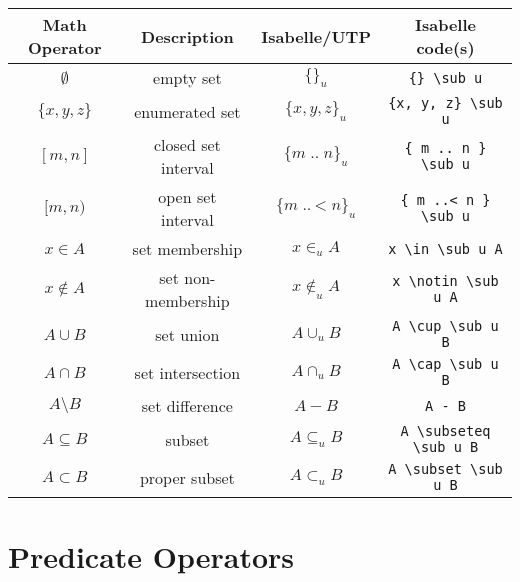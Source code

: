 \documentclass[11pt]{article}
\begin{document}
\begin{center}
\begin{tabular}{|c|c|c|c|} \hline
  \textbf{Math Operator}         & \textbf{Description}        & \textbf{Isabelle/UTP}          & \textbf{Isabelle code(s)} \\ \hline
  $\emptyset$                    & empty set                   & $\{\}_u$                       & \verb|{} \sub u| \\
  $\{ x, y, z \}$                & enumerated set              & $\{ x, y, z \}_u$              & \verb|{x, y, z} \sub u| \\  
  $[m, n]$                       & closed set interval         & $\{ m \mathop{..} n \}_u$               & \verb|{ m .. n } \sub u| \\
  $[m, n)$                       & open set interval           & $\{ m \mathop{..\!\!<} n \}_u$              & \verb|{ m ..< n } \sub u| \\
  $x \in A$                      & set membership              & $x \in_u A$                    & \verb|x \in \sub u A| \\
  $x \notin A$                   & set non-membership          & $x \notin_u A$                 & \verb|x \notin \sub u A| \\
  $A \cup B$                     & set union                   & $A \cup_u B$                   & \verb|A \cup \sub u B| \\  
  $A \cap B$                     & set intersection            & $A \cap_u B$                   & \verb|A \cap \sub u B| \\  
  $A \setminus B$                & set difference              & $A - B$                        & \verb|A - B| \\
  $A \subseteq B$                & subset                      & $A \subseteq_u B$              & \verb|A \subseteq \sub u B| \\
  $A \subset B$                  & proper subset               & $A \subset_u B$                & \verb|A \subset \sub u B| \\
  \hline
\end{tabular}
\end{center}
\newpage

\section{Predicate Operators}
\end{document}
